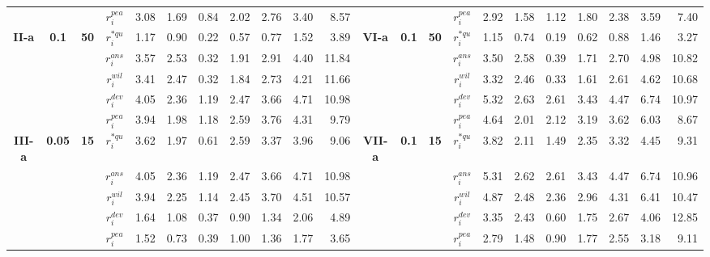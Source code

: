 \documentclass[11pt,authoryear,review,3p,times]{elsarticle}
\newcommand{\dev}{$r_i^{dev}$}
\newcommand{\pea}{$r_i^{pea}$}
\newcommand{\wil}{$r_i^{wil}$}
\newcommand{\aasc}{$r_i^{ans}$}
\newcommand{\aqu}{$r_i^{*qu}$}
\begin{document}
\begin{landscape}
\begin{table}
{\begin{tabular}{ccccrrrrrrr|rrrrrrrrrrr}
	&       &       & \pea  & 3.08  & 1.69  & 0.84  & 2.02  & 2.76  & 3.40  & 8.57  &       &       &       & \multicolumn{1}{c}{\pea} & 2.92  & 1.58  & 1.12  & 1.80  & 2.38  & 3.59  & 7.40 \\
	\textbf{II-a} & \textbf{0.1} & \textbf{50} & \aqu  & 1.17  & 0.90  & 0.22  & 0.57  & 0.77  & 1.52  & 3.89  & \multicolumn{1}{c}{\textbf{VI-a}} & \multicolumn{1}{c}{\textbf{0.1}} & \multicolumn{1}{c}{\textbf{50}} & \multicolumn{1}{c}{\aqu} & 1.15  & 0.74  & 0.19  & 0.62  & 0.88  & 1.46  & 3.27 \\
	&       &       & \aasc & 3.57  & 2.53  & 0.32  & 1.91  & 2.91  & 4.40  & 11.84 &       &       &       & \multicolumn{1}{c}{\aasc} & 3.50  & 2.58  & 0.39  & 1.71  & 2.70  & 4.98  & 10.82 \\
	&       &       & \wil  & 3.41  & 2.47  & 0.32  & 1.84  & 2.73  & 4.21  & 11.66 &       &       &       & \multicolumn{1}{c}{\wil} & 3.32  & 2.46  & 0.33  & 1.61  & 2.61  & 4.62  & 10.68 \\
	\hline
	&       &       & \dev  & 4.05  & 2.36  & 1.19  & 2.47  & 3.66  & 4.71  & 10.98 &       &       &       & \multicolumn{1}{c}{\dev} & 5.32  & 2.63  & 2.61  & 3.43  & 4.47  & 6.74  & 10.97 \\
	&       &       & \pea  & 3.94  & 1.98  & 1.18  & 2.59  & 3.76  & 4.31  & 9.79  &       &       &       & \multicolumn{1}{c}{\pea} & 4.64  & 2.01  & 2.12  & 3.19  & 3.62  & 6.03  & 8.67 \\
	\textbf{III-a} & \textbf{0.05} & \textbf{15} & \aqu  & 3.62  & 1.97  & 0.61  & 2.59  & 3.37  & 3.96  & 9.06  & \multicolumn{1}{c}{\textbf{VII-a}} & \multicolumn{1}{c}{\textbf{0.1}} & \multicolumn{1}{c}{\textbf{15}} & \multicolumn{1}{c}{\aqu} & 3.82  & 2.11  & 1.49  & 2.35  & 3.32  & 4.45  & 9.31 \\
	&       &       & \aasc & 4.05  & 2.36  & 1.19  & 2.47  & 3.66  & 4.71  & 10.98 &       &       &       & \multicolumn{1}{c}{\aasc} & 5.31  & 2.62  & 2.61  & 3.43  & 4.47  & 6.74  & 10.96 \\
	&       &       & \wil  & 3.94  & 2.25  & 1.14  & 2.45  & 3.70  & 4.51  & 10.57 &       &       &       & \multicolumn{1}{c}{\wil} & 4.87  & 2.48  & 2.36  & 2.96  & 4.31  & 6.41  & 10.47 \\
	\hline
	&       &       & \dev  & 1.64  & 1.08  & 0.37  & 0.90  & 1.34  & 2.06  & 4.89  &       &       &       & \multicolumn{1}{c}{\dev} & 3.35  & 2.43  & 0.60  & 1.75  & 2.67  & 4.06  & 12.85 \\
	&       &       & \pea  & 1.52  & 0.73  & 0.39  & 1.00  & 1.36  & 1.77  & 3.65  &       &       &       & \multicolumn{1}{c}{\pea} & 2.79  & 1.48  & 0.90  & 1.77  & 2.55  & 3.18  & 9.11 \\

\end{tabular}}
\end{table}
\end{landscape}
\end{document}
